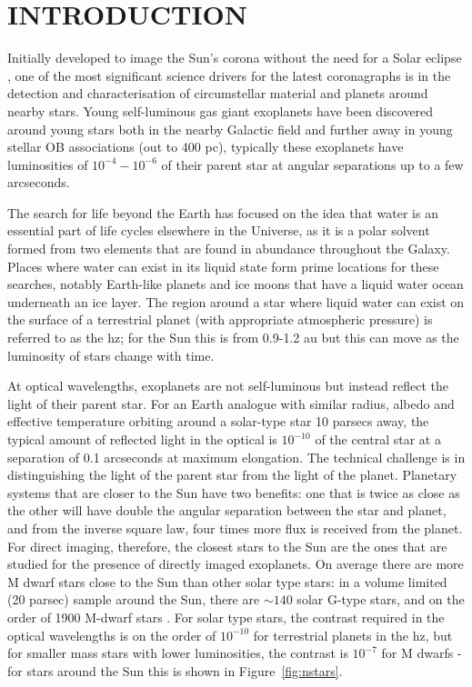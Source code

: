 \documentclass[letterpaper]{ar-1col}
\begin{document}
\tableofcontents

\section{INTRODUCTION}
\label{sec:intro}



Initially developed to image the Sun's corona without the need for a Solar eclipse \citep{Lyot33}, one of the most significant science drivers for the latest coronagraphs is in the detection and characterisation of circumstellar material and planets around nearby stars.
%
Young self-luminous gas giant exoplanets have been discovered around young stars \citep[see ][ for a review of these detections]{Zurlo24} both in the nearby Galactic field and further away in young stellar OB associations (out to 400 pc), typically these exoplanets have luminosities of $10^{-4}-10^{-6}$ of their parent star at angular separations up to a few arcseconds. 

The search for life beyond the Earth has focused on the idea that water is an essential part of life cycles elsewhere in the Universe, as it is a polar solvent formed from two elements that are found in abundance throughout the Galaxy.
%
Places where water can exist in its liquid state form prime locations for these searches, notably Earth-like planets and ice moons that have a liquid water ocean underneath an ice layer.
%
The region around a star where liquid water can exist on the surface of a terrestrial planet (with appropriate atmospheric pressure) is referred to as the \ac{hz}; for the Sun this is from 0.9-1.2 au but this can move as the luminosity of stars change with time.

At optical wavelengths, exoplanets are not self-luminous but instead reflect the light of their parent star.
%
For an Earth analogue with similar radius, albedo and effective temperature orbiting around a solar-type star 10 parsecs away, the typical amount of reflected light in the optical is $10^{-10}$ of the central star at a separation of 0.1 arcseconds at maximum elongation.
%
The technical challenge is in distinguishing the light of the parent star from the light of the planet.
%
Planetary systems that are closer to the Sun have two benefits: one that is twice as close as the other will have double the angular separation between the star and planet, and from the inverse square law, four times more flux is received from the planet.
%
For direct imaging, therefore, the closest stars to the Sun are the ones that are studied for the presence of directly imaged exoplanets.
%
On average there are more M dwarf stars close to the Sun than other solar type stars: in a volume limited (20 parsec) sample around the Sun, there are $\sim 140$ solar G-type stars, and on the order of 1900 M-dwarf stars \citep{Kirkpatrick24}.
%
For solar type stars, the contrast required in the optical wavelengths is on the order of $10^{-10}$ for terrestrial planets in the \ac{hz}, but for smaller mass stars with lower luminosities, the contrast is $10^{-7}$ for M dwarfs - for stars around the Sun this is shown in Figure~\ref{fig:nstars}.
\end{document}

